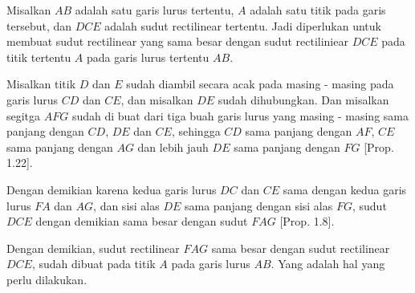 \documentclass[a4paper]{book}
\begin{document}
\begin{center}
\end{center}

Misalkan $AB$ adalah satu garis lurus tertentu, $A$ adalah satu titik pada 
garis tersebut, dan $DCE$ adalah sudut rectilinear tertentu. Jadi diperlukan
untuk membuat sudut rectilinear yang sama besar dengan sudut rectiliniear
$DCE$ pada titik tertentu $A$ pada garis lurus tertentu $AB$.

Misalkan titik $D$ dan $E$ sudah diambil secara acak pada masing - masing
pada garis lurus $CD$ dan $CE$, dan misalkan $DE$ sudah dihubungkan. 
Dan misalkan segitga $AFG$ sudah di buat dari tiga buah garis lurus yang 
masing - masing sama panjang dengan $CD$, $DE$ dan $CE$, sehingga $CD$ sama
panjang dengan $AF$, $CE$ sama panjang dengan $AG$ dan lebih jauh $DE$ 
sama panjang dengan $FG$ [Prop. 1.22].

Dengan demikian karena kedua garis lurus $DC$ dan $CE$ sama dengan kedua
garis lurus $FA$ dan $AG$, dan sisi alas $DE$ sama panjang dengan sisi
alas $FG$, sudut $DCE$ dengan demikian sama besar dengan 
sudut $FAG$ [Prop. 1.8].

Dengan demikian, sudut rectilinear $FAG$ sama besar dengan sudut rectilinear
$DCE$, sudah dibuat pada titik $A$ pada garis lurus $AB$. Yang adalah hal
yang perlu dilakukan.

\end{document}
